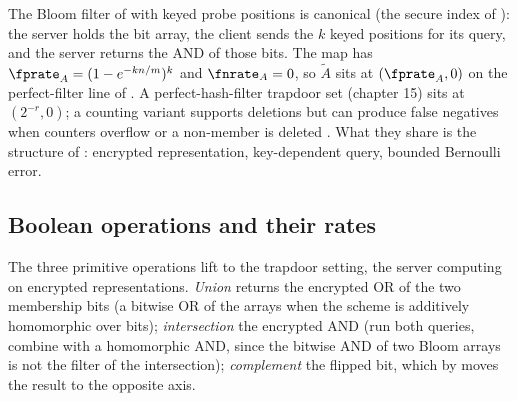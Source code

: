 The Bloom filter of  with keyed probe
positions is canonical (the secure index of \textcite{goh-2003}): the
server holds the bit array, the client sends the $k$ keyed positions for
its query, and the server returns the AND of those bits. The map has $\fprate_A = (1 - e^{-kn/m})^k$ and $\fnrate_A
= 0$, so $\tilde A$ sits at $(\fprate_A, 0)$ on the perfect-filter line of
. A perfect-hash-filter trapdoor set
(chapter 15) sits at $(2^{-r}, 0)$; a counting variant supports deletions
but can produce false negatives when counters overflow or a non-member is
deleted \parencite{guo-et-al-2010}. What they share is the structure of
: encrypted representation, key-dependent query,
bounded Bernoulli error.

\subsection*{Boolean operations and their rates}

The three primitive operations lift to the trapdoor setting, the server
computing on encrypted representations. \emph{Union} returns the
encrypted OR of the two membership bits (a bitwise OR of the arrays when
the scheme is additively homomorphic over bits); \emph{intersection} the
encrypted AND (run both queries, combine with a homomorphic AND, since
the bitwise AND of two Bloom arrays is not the filter of the
intersection); \emph{complement} the flipped bit, which by
 moves the result to the opposite axis.

